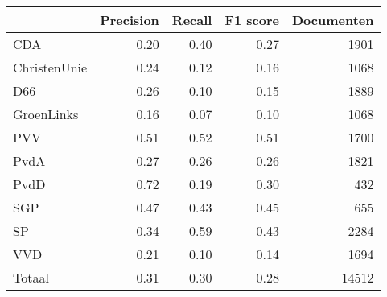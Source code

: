 \begin{tabular}{lrrrr}
\toprule
{} &  Precision &  Recall &  F1 score &  Documenten \\
\midrule
CDA          &       0.20 &    0.40 &      0.27 &        1901 \\
ChristenUnie &       0.24 &    0.12 &      0.16 &        1068 \\
D66          &       0.26 &    0.10 &      0.15 &        1889 \\
GroenLinks   &       0.16 &    0.07 &      0.10 &        1068 \\
PVV          &       0.51 &    0.52 &      0.51 &        1700 \\
PvdA         &       0.27 &    0.26 &      0.26 &        1821 \\
PvdD         &       0.72 &    0.19 &      0.30 &         432 \\
SGP          &       0.47 &    0.43 &      0.45 &         655 \\
SP           &       0.34 &    0.59 &      0.43 &        2284 \\
VVD          &       0.21 &    0.10 &      0.14 &        1694 \\
Totaal       &       0.31 &    0.30 &      0.28 &       14512 \\
\bottomrule
\end{tabular}
